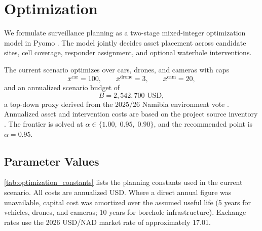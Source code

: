 \section{Optimization}

\setlength{\parskip}{0.7em}
\setlength{\parindent}{0pt}

We formulate surveillance planning as a two-stage mixed-integer optimization model in Pyomo \cite{pyomo_github}. The model jointly decides asset placement across candidate sites, cell coverage, responder assignment, and optional waterhole interventions.

The current scenario optimizes over cars, drones, and cameras with caps
\[
\bar{x}^{\mathrm{car}} = 100,
\qquad
\bar{x}^{\mathrm{drone}} = 3,
\qquad
\bar{x}^{\mathrm{cam}} = 20,
\]
and an annualized scenario budget of
\[
B = 2{,}542{,}700 \text{ USD},
\]
a top-down proxy derived from the 2025/26 Namibia environment vote \cite{namibian2025budget}. Annualized asset and intervention costs are based on the project source inventory \cite{meft_fire_strategy,dji_matrice4_release,reconyx_hyperfire4k,reconyx_cellplan,meft_boreholes_2025}.
The frontier is solved at $\alpha \in \{1.00,\;0.95,\;0.90\}$, and the recommended point is $\alpha = 0.95$.

\subsection{Parameter Values}

\cref{tab:optimization_constants} lists the planning constants used in the current scenario. All costs are annualized USD. Where a direct annual figure was unavailable, capital cost was amortized over the assumed useful life (5 years for vehicles, drones, and cameras; 10 years for borehole infrastructure). Exchange rates use the 2026 USD/NAD market rate of approximately 17.01.

